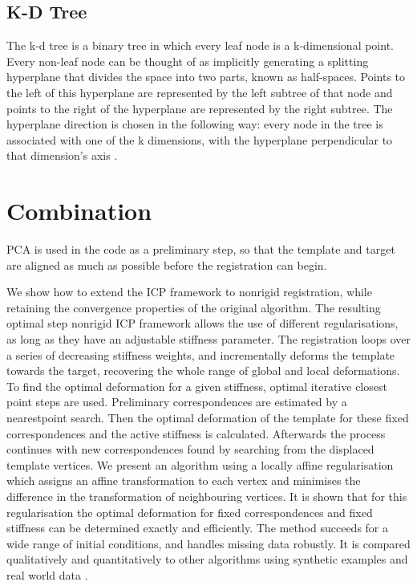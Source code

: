 \documentclass[../structure.tex]{subfiles}
\begin{document}
\subsection{K-D Tree}
The k-d tree is a binary tree in which every leaf node is a k-dimensional point. Every non-leaf node can be thought of as implicitly generating a splitting hyperplane that divides the space into two parts, known as half-spaces. Points to the left of this hyperplane are represented by the left subtree of that node and points to the right of the hyperplane are represented by the right subtree. The hyperplane direction is chosen in the following way: every node in the tree is associated with one of the k dimensions, with the hyperplane perpendicular to that dimension's axis \cite{JonLouisBentley1975}.
\section{Combination}
PCA is used in the code as a preliminary step, so that the template and target are aligned as much as possible before the registration can begin.


We show how to extend the ICP framework to nonrigid registration, while retaining the convergence properties of the original algorithm. The resulting optimal step nonrigid ICP framework allows the use of different regularisations, as long as they have an adjustable stiffness parameter. The registration loops over a series of decreasing stiffness weights, and incrementally deforms the template towards the target, recovering the whole range of global and local deformations. To find the optimal deformation for a given stiffness, optimal iterative closest point steps are used. Preliminary correspondences are estimated by a nearestpoint search. Then the optimal deformation of the template for these fixed correspondences and the active stiffness is calculated. Afterwards the process continues with new correspondences found by searching from the displaced template vertices. We present an algorithm using a locally affine regularisation which assigns an affine transformation to each vertex and minimises the difference in the transformation of neighbouring vertices. It is shown that for this regularisation the optimal deformation for fixed correspondences and fixed stiffness can be determined exactly and efficiently. The method succeeds for a wide range of initial conditions, and handles missing data robustly. It is compared qualitatively and quantitatively to other algorithms using synthetic examples and real world data \cite{Amberg2007}.
\end{document}
